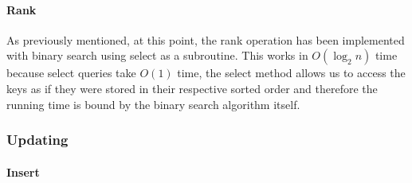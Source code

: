 \paragraph{Rank}
As previously mentioned, at this point, the rank operation has been implemented with binary search using select as a subroutine. This works in $O(\log_2 n)$ time because select queries take $O(1)$ time, the select method allows us to access the keys as if they were stored in their respective sorted order and therefore the running time is bound by the binary search algorithm itself.

\subsubsection{Updating}

\paragraph{Insert} \label{sec:binaryRankInsertExample}

